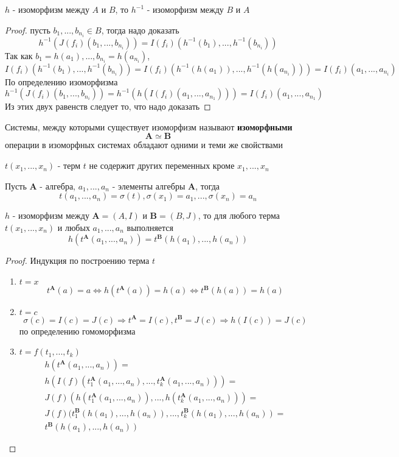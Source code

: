 \documentclass{article}
\begin{document}
\begin{thm}
$h$ - изоморфизм между $A$ и $B$, то $h^{-1}$ - изоморфизм между $B$ и $A$
\end{thm}
\begin{proof} пусть $b_1,...,b_{n_i}\in B$, тогда надо доказать
$$h^{-1}(J(f_i)(b_1,...,b_{n_i}))=I(f_i)(h^{-1}(b_1),...,h^{-1}(b_{n_i}))$$
Так как $b_1=h(a_1),...,b_{n_i}=h(a_{n_i})$,
$$I(f_i)(h^{-1}(b_1),...,h^{-1}(b_{n_i}))=I(f_i)(h^{-1}(h(a_1)),...,h^{-1}(h(a_{n_i})))=I(f_i)(a_1,...,a_{n_i})$$
По определению изоморфизма
$$h^{-1}(J(f_i)(b_1,...,b_{n_i}))=h^{-1}(h(I(f_i)(a_1,...,a_{n_1})))=I(f_i)(a_1,...,a_{n_1})$$
Из этих двух равенств следует то, что надо доказать
\end{proof}

\begin{dfn}
Системы, между которыми существует изоморфизм называют \textbf{изоморфными}
$$\mathbf{A}\simeq\mathbf{B}$$
операции в изоморфных системах обладают одними и теми же свойствами
\end{dfn}

\begin{dfn}
$t(x_1,...,x_n)$ - терм $t$ не содержит других переменных кроме $x_1,...,x_n$
\end{dfn}
\begin{dfn}
Пусть $\mathbf{A}$ - алгебра, $a_1,...,a_n$ - элементы алгебры $\mathbf{A}$, тогда
$$t(a_1,...,a_n)=\sigma(t), \sigma(x_1)=a_1,...,\sigma(x_n)=a_n$$
\end{dfn}
\begin{thm}
$h$ - изоморфизм между $\mathbf{A}=(A,I)$ и $\mathbf{B}=(B,J)$, то для любого терма $t(x_1,...,x_n)$ и любых $a_1,...,a_n$ выполняется
$$h(t^{\mathbf{A}}(a_1,...,a_n))=t^{\mathbf{B}}(h(a_1),...,h(a_n))$$
\end{thm}
\begin{proof}
Индукция по построению терма $t$
\begin{enumerate}
\item $t=x$
$$t^{\mathbf{A}}(a)=a\Leftrightarrow h(t^{\mathbf{A}}(a))=h(a)\Leftrightarrow t^{\mathbf{B}}(h(a))=h(a)$$
\item $t=c$
$$\sigma(c)=I(c)=J(c)\Rightarrow t^{\mathbf{A}}=I(c), t^{\mathbf{B}}=J(c)\Rightarrow h(I(c))=J(c)$$
по определению гомоморфизма
\item $t=f(t_1,...,t_k)$
\begin{multline*}
h(t^{\mathbf{A}}(a_1,...,a_n))=\\
h(I(f)(t^{\mathbf{A}}_{1}(a_1,...,a_n),...,t^{\mathbf{A}}_{k}(a_1,...,a_n)))=\\
J(f)(h(t^{\mathbf{A}}_{1}(a_1,...,a_n)),...,h(t^{\mathbf{A}}_{k}(a_1,...,a_n)))=\\
J(f)(t^{\mathbf{B}}_{1}(h(a_1),...,h(a_n)),...,t^{\mathbf{B}}_{k}(h(a_1),...,h(a_n))=\\
t^{\mathbf{B}}(h(a_1),...,h(a_n))
\end{multline*}
\end{enumerate}
\end{proof}
\end{document}
